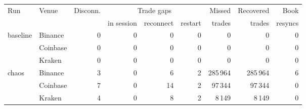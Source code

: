\begin{tabular}{llrrrrrrr}
\toprule
Run & Venue & Disconn. & \multicolumn{3}{c}{Trade gaps} & Missed & Recovered & Book \\
\cmidrule(lr){4-6}
 & & & in session & reconnect & restart & trades & trades & resyncs \\
\midrule
baseline & Binance & 0 & 0 & 0 & 0 & 0 & 0 & 0 \\
 & Coinbase & 0 & 0 & 0 & 0 & 0 & 0 & 0 \\
 & Kraken & 0 & 0 & 0 & 0 & 0 & 0 & 0 \\
\midrule
chaos & Binance & 3 & 0 & 6 & 2 & 285\,964 & 285\,964 & 6 \\
 & Coinbase & 7 & 0 & 14 & 2 & 97\,344 & 97\,344 & 0 \\
 & Kraken & 4 & 0 & 8 & 2 & 8\,149 & 8\,149 & 0 \\
\bottomrule
\end{tabular}
